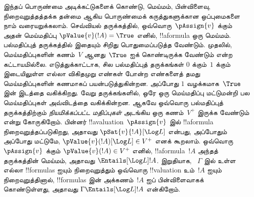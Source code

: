 \documentclass[../../../include/open-logic-section]{subfiles}
\begin{document}
இந்தப் பொருண்மை அடிக்கட்டுகளைக் கொண்டு, மெய்மம், பின்விளைவு,
நிறைவுறுத்தத்தக்க தன்மை ஆகிய பொருண்மைக் கருத்துகளுக்கான ஒப்புமைகளை நாம்
வரையறுக்கலாம். செவ்வியல் தருக்கத்தில், ஒவ்வொரு~$\pAssign{v}$ க்கும் அதன்
மெய்மதிப்பு $\pValue{v}(!A) = \True$ எனில், !!a{formula} ஒரு மெய்மம்.
பல்மதிப்புத் தருக்கத்தில் இதையும் சிறிது பொதுமைப்படுத்த வேண்டும். முதலில்,
மெய்மதிப்புகளின் கணம்~$V$ ஆனது~$\True$ ஐக் கொண்டிருக்க வேண்டும் என்ற
கட்டாயமில்லை. எடுத்துக்காட்டாக, சில பல்மதிப்புத் தருக்கங்கள் $0$ க்கும்~$1$
க்கும் இடையிலுள்ள எல்லா விகிதமுறு எண்கள் போன்ற எண்களைத் தமது
மெய்மதிப்புகளின் கணமாகப் பயன்படுத்துகின்றன. அப்போது $1$ வழக்கமாக~$\True$
இன் இடத்தை வகிக்கிறது. வேறு தருக்கங்களில், ஒரே ஒரு மெய்மதிப்பு மட்டுமன்றி
பல மெய்மதிப்புகள் அவ்விடத்தை வகிக்கின்றன. ஆகவே ஒவ்வொரு பல்மதிப்புத்
தருக்கத்திற்கும் \emph{நியமிக்கப்பட்ட மதிப்புகள்} அடங்கிய ஒரு கணம்~$V^+$
இருக்க வேண்டும் என்று கோருகிறோம். பின்னர் !!a{valuation}~$\pAssign{v}$
இல் !!a{formula} நிறைவுறுத்தப்படுகிறது, அதாவது
$\pSat{v}{!A}[\Log L]$ என்பது, அப்போதும் அப்போது மட்டுமே,
$\pValue{v}(!A)[\Log L] \in V^+$ எனக் கூறலாம். ஒவ்வொரு~$\pAssign{v}$
க்கும் $\pValue{v}(!A) \in V^+$ எனில், !!a{formula}~$!A$ அந்தத்
தருக்கத்தின் மெய்மம், அதாவது $\Entails[\Log L] !A$. இறுதியாக,
~$\Gamma$ இல் உள்ள எல்லா !!{formula}s ஐயும் நிறைவுறுத்தும் ஒவ்வொரு
!!{valuation} உம்~$!A$ ஐயும் நிறைவுறுத்தினால், !!{formula}s இன்
அக்கணம்~$!A$ ஐப் பின்விளைவாகக் கொண்டுள்ளது, அதாவது
$\Gamma \Entails[\Log L] !A$ என்கிறோம்.
\end{document}
